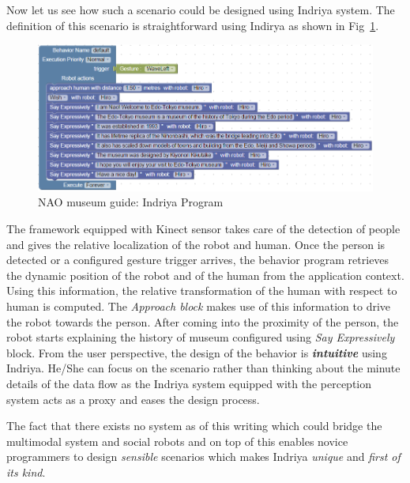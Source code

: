 Now let us see how such a scenario could be designed using Indriya system. The definition of this scenario is straightforward using Indirya as shown in Fig~\ref{fig:scenario1_program}.
\begin{figure}[H]
\centering
\includegraphics[width=\textwidth]{../thesis/assets/scenario1_new.png}
\caption[NAO museum guide: Indriya Program]{NAO museum guide: Indriya Program}
\label{fig:scenario1_program}
\end{figure}
The framework equipped with Kinect sensor takes care of the detection of people and gives the relative localization of the robot and human. Once the person is detected or a configured gesture trigger arrives, the behavior program retrieves the dynamic position of the robot and of the human from the application context. Using this information, the relative transformation of the human with respect to human is computed. The \emph{Approach block} makes use of this information to drive the robot towards the person. After coming into the proximity of the person, the robot starts explaining the history of museum configured using \emph{Say Expressively} block. From the user perspective, the design of the behavior is \textbf{\emph{intuitive}} using Indriya. He/She can focus on the scenario rather than thinking about the minute details of the data flow as the Indriya system equipped with the perception system acts as a proxy and eases the design process. 

The fact that there exists no system as of this writing which could bridge the multimodal system and social robots and on top of this enables novice programmers to design \emph{sensible} scenarios which makes Indriya \emph{unique} and \emph{first of its kind}.

